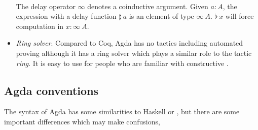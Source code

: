 \begin{itemize}
\begin{code}
\>  \AgdaSymbol{(} \AgdaSymbol{:} \AgdaSymbol{)} \AgdaSymbol{:}  \<%
\\
\>[0]\<[2]%
\>[2] \AgdaSymbol{:}    \AgdaSymbol{(} \AgdaSymbol{)}   \<%
\end{code}

The delay operator $\infty$ denotes a coinductive argument. Given $a:A$, the expression with a delay function $\sharp~a$ is an element of type $\infty~A$. $\flat~x$ will force computation in $x : \infty~A$.


\item \textit{Ring solver}. Compared to Coq, Agda has no tactics including automated proving although it has a ring solver which plays a similar role to the tactic \textit{ring}. It is easy to use for people who are familiar with constructive \maths.
\end{itemize} 


\subsection{Agda conventions}\label{agdaconventions}

The syntax of Agda has some similarities to Haskell or \mltt, but there are some important differences which may make confusions,

